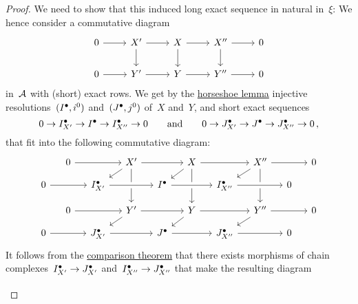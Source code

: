 \begin{proof}
  We need to show that this induced long exact sequence in natural in~$\xi$:
  We hence consider a commutative diagram
  \[
    \begin{tikzcd}
        0
        \arrow{r}
      & X'
        \arrow{r}
        \arrow{d}
      & X
        \arrow{r}
        \arrow{d}
      & X''
        \arrow{r}
        \arrow{d}
      & 0
      \\
        0
        \arrow{r}
      & Y'
        \arrow{r}
      & Y
        \arrow{r}
      & Y''
        \arrow{r}
      & 0
    \end{tikzcd}
  \]
  in~$\mathcal{A}$ with (short) exact rows.
  We get by the \hyperref[horseshoe lemma]{horseshoe lemma} injective resolutions~$(I^\bullet, i^0)$ and~$(J^\bullet, j^0)$ of~$X$ and~$Y$, and short exact sequences
  \[
    0
    \to
    I^\bullet_{X'}
    \to
    I^\bullet
    \to
    I^\bullet_{X''}
    \to
    0
    \qquad\text{and}\qquad
    0
    \to
    J^\bullet_{X'}
    \to
    J^\bullet
    \to
    J^\bullet_{X''}
    \to
    0 \,,
  \]
  that fit into the following commutative diagram:
  \[
    \begin{tikzcd}[sep = small]
        {}
      & 0
        \arrow{rr}
      & {}
      & X'
        \arrow{rr}
        \arrow{dl}
        \arrow{dd}
      & {}
      & X
        \arrow{rr}
        \arrow{dl}
        \arrow{dd}
      & {}
      & X''
        \arrow{rr}
        \arrow{dl}
        \arrow{dd}
      & {}
      & 0
      \\
        0
        \arrow{rr}
      & {}
      & \Iccc_{X'}
      & {}
      & \Iccc
        \arrow[from=ll, crossing over]
      & {}
      & \Iccc_{X''}
        \arrow[from=ll, crossing over]
      & {}
      & 0
        \arrow[from=ll, crossing over]
      & {}
      \\
        {}
      & 0
        \arrow{rr}
      & {}
      & Y'
        \arrow{rr}
        \arrow{dl}
      & {}
      & Y
        \arrow{rr}
        \arrow{dl}
      & {}
      & Y''
        \arrow{rr}
        \arrow{dl}
      & {}
      & 0
      \\
        0
        \arrow{rr}
      & {}
      & \Jccc_{X'}
        \arrow{rr}
      & {}
      & \Jccc
        \arrow{rr}
      & {}
      & \Jccc_{X''}
        \arrow{rr}
      & {}
      & 0
      & {}
    \end{tikzcd}
  \]
  It follows from the \hyperref[comparison theorem]{comparison theorem} that there exists morphisms of chain complexes~$I^\bullet_{X'} \to J^\bullet_{X'}$ and~$I^\bullet_{X''} \to J^\bullet_{X''}$ that make the resulting diagram
  \[
    \begin{tikzcd}[sep = small]

\end{tikzcd}\]
\end{proof}
